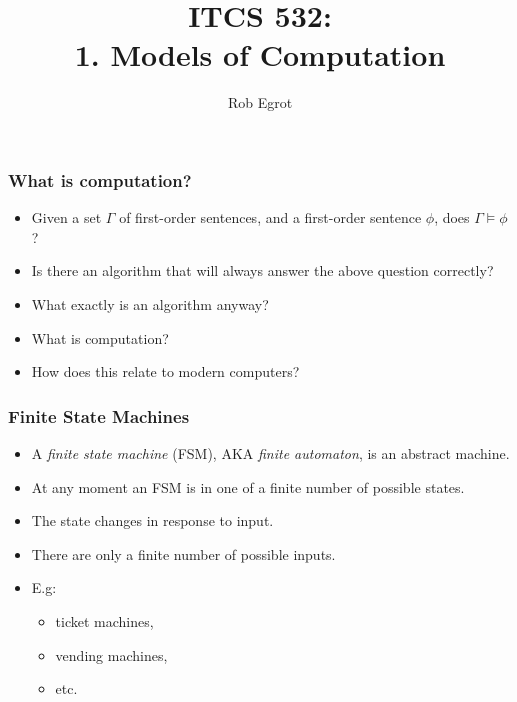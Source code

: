 \documentclass[handout]{beamer}
\title{ITCS 532:\\ 1. Models of Computation}
\date{}
\author{Rob Egrot}
\begin{document}
\begin{frame}
\titlepage
\end{frame}

\begin{frame}
\frametitle{What is computation?}
\begin{itemize}
\item Given a set $\Gamma$ of first-order sentences, and a first-order sentence $\phi$, does $\Gamma\models \phi$?
\vspace{0.5cm}
\item Is there an algorithm that will always answer the above question correctly?
\vspace{0.5cm}
\item What exactly is an algorithm anyway?
\vspace{0.5cm}
\item What is computation?
\vspace{0.5cm}
\item How does this relate to modern computers?
\end{itemize}

\end{frame}

\begin{frame}
\frametitle{Finite State Machines}
\begin{itemize}
\item A \emph{finite state machine} (FSM), AKA \emph{finite automaton}, is an abstract machine.
\vspace{0.5cm}
\item At any moment an FSM is in one of a finite number of possible states.
\vspace{0.5cm}
\item The state changes in response to input.
\vspace{0.5cm}
\item There are only a finite number of possible inputs.
\item E.g:
\begin{itemize}
\item ticket machines,
\item vending machines,
\item etc.
\end{itemize}
\end{itemize}

\end{frame}
\end{document}
